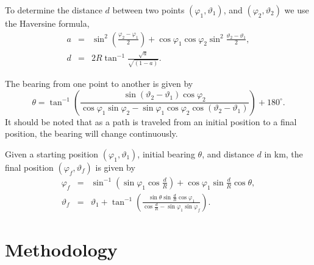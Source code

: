 \documentclass[journal]{vgtc}                %
\begin{document}
To determine the distance $d$ between two points $(\varphi_{1}, \vartheta_{1})$, and $(\varphi_{2}, \vartheta_{2})$
we use the Haversine formula,
\[
 \begin{array}{lcl}
 a &=& \sin^2(\frac{\varphi_{2}-\varphi_{1}}{2}) + \cos\varphi_{1} \cos\varphi_{2} \sin^2\frac{\vartheta_{2}-\vartheta_{1}}{2}, \\
 d &=& 2R \tan^{-1}\frac{\sqrt a}{\sqrt {(1-a)}}.
 \end{array}
 \label{eq:hav}
\]

The bearing from one point to another is given by
\[
  \theta = \tan^{-1}( \frac{\sin(\vartheta_{2}-\vartheta_{1}) \cos\varphi_{2}}{\cos\varphi_{1} \sin\varphi_{2} - \sin\varphi_{1} \cos\varphi_{2} \cos(\vartheta_{2} - \vartheta_{1})}) + 180^\circ. %
 \label{eq:bear}
\]
It should be noted that as a path is traveled from an initial position to a final position, the bearing will change 
continuously.

Given a starting position $(\varphi_{1}, \vartheta_{1})$, initial bearing $\theta$, and distance $d$ in km, the final
position $(\varphi_{f}, \vartheta_{f})$
is given by
\[
 \begin{array}{lcl}
  \varphi_{f} &=& \sin^{-1} (\sin\varphi_{1} \cos\frac{d}{R}) + \cos\varphi_{1}\sin\frac{d}{R} \cos\theta, \label{eq:dest} \\
  \vartheta_{f} &=& \vartheta_{1} + \tan^{-1}(\frac{\sin\theta \sin\frac{d}{R} \cos\varphi_{1}}{\cos\frac{d}{R} - \sin\varphi_{1} \sin\varphi_{f}}).
 \end{array}
\]

\section{Methodology}
\end{document}
